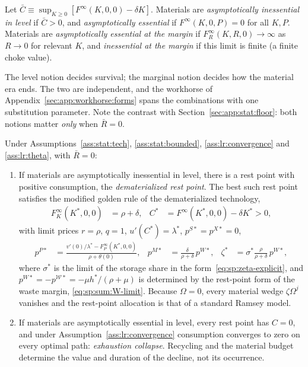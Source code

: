 \begin{definition}\label{def:lr:essentiality}
Let $\bar C\equiv\sup_{K\ge0}\left[F^\infty\left(K,0,0\right)-\delta K\right]$. Materials are \emph{asymptotically inessential in level} if $\bar C>0$, and \emph{asymptotically essential} if $F^\infty\left(K,0,P\right)=0$ for all $K,P$. Materials are \emph{asymptotically essential at the margin} if $F^\infty_R\left(K,R,0\right)\to\infty$ as $R\to0$ for relevant $K$, and \emph{inessential at the margin} if this limit is finite (a finite choke value).
\end{definition}

The level notion decides survival; the marginal notion decides how the material era ends. The two are independent, and the workhorse of Appendix~\ref{sec:app:workhorse:forms} spans the combinations with one substitution parameter. Note the contrast with Section~\ref{sec:app:stat:floor}: both notions matter \emph{only} when $\bar R=0$.

\begin{proposition}[survival dichotomy, stationary technology, $\bar R=0$]\label{prop:lr:dichotomy}
Under Assumptions~\ref{ass:stat:tech}, \ref{ass:stat:bounded}, \ref{ass:lr:convergence} and \ref{ass:lr:theta}, with $\bar R=0$:
\begin{enumerate}
    \item If materials are asymptotically inessential in level, there is a rest point with positive consumption, the \emph{dematerialized rest point}. The best such rest point satisfies the modified golden rule of the dematerialized technology,
    \begin{align}
    F^\infty_K\left(K^*,0,0\right) &= \rho+\delta,
    &
    C^* &= F^\infty\left(K^*,0,0\right)-\delta K^*>0,
    \label{eq:sp:lr:mgr}
    \end{align}
    with limit prices $r=\rho$, $q=1$, $u'\left(C^*\right)=\lambda^*$, $p^{S*}=p^{X*}=0$,
    \begin{align}
    p^{P*} &= \frac{v'\left(0\right)/\lambda^*-F^\infty_P\left(K^*,0,0\right)}{\rho+\theta\left(0\right)},
    &
    p^{M*} &= \frac{\delta}{\rho+\delta}\,p^{W*},
    &
    \zeta^* &= \sigma^*\frac{\rho}{\rho+\delta}\,p^{W*},
    \label{eq:sp:lr:restprices}
    \end{align}
    where $\sigma^*$ is the limit of the storage share in the form~\eqref{eq:sp:zeta-explicit}, and $p^{W*}=-p^{\mathcal W*}=-\mu h^*/\left(\rho+\mu\right)$ is determined by the rest-point form of the waste margin, \eqref{eq:sp:sum:W-limit}. Because $\Omega=0$, every material wedge $\zeta\Omega^j$ vanishes and the rest-point allocation is that of a standard Ramsey model.
    \item If materials are asymptotically essential in level, every rest point has $C=0$, and under Assumption~\ref{ass:lr:convergence} consumption converges to zero on every optimal path: \emph{exhaustion collapse}. Recycling and the material budget determine the value and duration of the decline, not its occurrence.
\end{enumerate}
\end{proposition}

